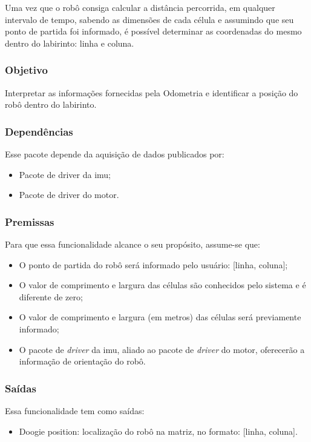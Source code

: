 Uma vez que o robô consiga calcular a distância percorrida, em qualquer intervalo de tempo, sabendo as dimensões de cada célula e assumindo que seu ponto de partida foi informado, é possível determinar as coordenadas do mesmo dentro do labirinto: linha e coluna. 

\subsubsection{Objetivo}
Interpretar as informações fornecidas pela Odometria e identificar a posição do robô dentro do labirinto.

\subsubsection{Dependências}
Esse pacote depende da aquisição de dados publicados por:
\begin{itemize}
	\item Pacote de driver da \gls*{imu};
	\item Pacote de driver do motor.
\end{itemize}
	
\subsubsection{Premissas}
Para que essa funcionalidade alcance o seu propósito, assume-se que:
\begin{itemize}
	\item O ponto de partida do robô será informado pelo usuário: [linha, coluna];
	\item O valor de comprimento e largura das células são conhecidos pelo sistema e é diferente de zero;
	\item O valor de comprimento e largura (em metros) das células será previamente informado;
	\item O pacote de \textit{driver} da \gls*{imu}, aliado ao pacote de \textit{driver} do motor, oferecerão a informação de orientação do robô.
\end{itemize}

\subsubsection{Saídas}
Essa funcionalidade tem como saídas:
\begin{itemize}
	\item Doogie position: localização do robô na matriz, no formato: [linha, coluna].
\end{itemize}


